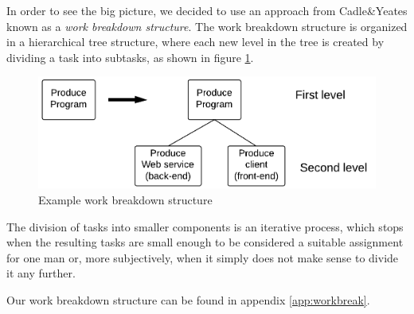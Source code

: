 In order to see the big picture, we decided to use an approach from Cadle\&Yeates\cite{caye} known as a \emph{work breakdown structure}. The work breakdown structure is organized in a hierarchical tree structure, where each new level in the tree is created by dividing a task into subtasks, as shown in figure \ref{fig:breakdown}.

\begin{figure}[hbtp]
	\includegraphics[scale=0.5]{./Empiri/Planning/img/wbslevels.png}
	\caption{Example work breakdown structure} \label{fig:breakdown}
\end{figure}

The division of tasks into smaller components is an iterative process, which stops when the resulting tasks are small enough to be considered a suitable assignment for one man or, more subjectively, when it simply does not make sense to divide it any further.

Our work breakdown structure can be found in appendix \ref{app:workbreak}.